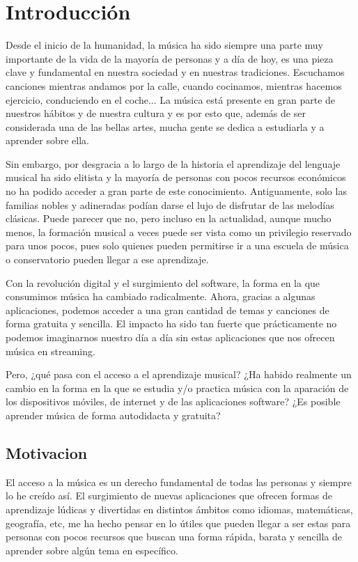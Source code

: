 \chapter{Introducción}
Desde el inicio de la humanidad, la música ha sido siempre una parte muy importante de la vida de la mayoría de personas y a día de hoy, es una pieza clave
 y fundamental en nuestra sociedad y en nuestras tradiciones. Escuchamos canciones mientras andamos por la calle, 
 cuando cocinamos, mientras hacemos ejercicio, conduciendo en el coche... La música está presente en gran
parte de nuestros hábitos y de nuestra cultura y es por esto que, además de ser considerada una de las
 bellas artes, mucha gente se dedica a estudiarla y a aprender sobre ella.

Sin embargo, por desgracia a lo largo de la historia el aprendizaje del lenguaje musical ha sido elitista y la mayoría
de personas con pocos recursos económicos no ha podido acceder a gran parte de este conocimiento. Antiguamente, solo
las familias nobles y adineradas podían darse el lujo de disfrutar de las melodías clásicas. Puede parecer que no, pero incluso en la actualidad,
aunque mucho menos, la formación musical a veces puede ser vista como un privilegio reservado para unos pocos, pues solo
quienes pueden permitirse ir a una escuela de música o conservatorio pueden llegar a ese aprendizaje.

Con la revolución digital y el surgimiento del software, la forma en la que consumimos música ha cambiado radicalmente.
Ahora, gracias a algunas aplicaciones, podemos acceder a una gran cantidad de temas y canciones de forma gratuita y sencilla.
El impacto ha sido tan fuerte que prácticamente no podemos imaginarnos nuestro día a día sin estas aplicaciones que nos ofrecen música en streaming.

Pero, ¿qué pasa con el acceso a el aprendizaje musical? ¿Ha habido realmente un cambio en la forma en la que se estudia y/o practica música
con la aparación de los dispositivos móviles, de internet y de las aplicaciones software? ¿Es posible aprender música de forma autodidacta y
gratuita?


\section{Motivacion}
El acceso a la música es un derecho fundamental de todas las personas y siempre lo he creído así. El surgimiento de nuevas
aplicaciones que ofrecen formas de aprendizaje lúdicas y divertidas en distintos ámbitos como idiomas, matemáticas, geografía, etc, me ha hecho pensar
en lo útiles que pueden llegar a ser estas para personas con pocos recursos que buscan una forma rápida, barata y sencilla de aprender sobre algún tema
en específico.

